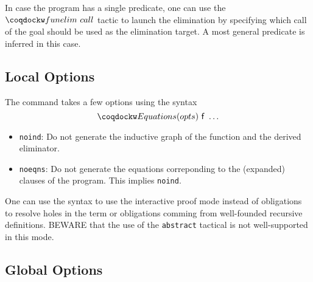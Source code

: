 In case the program has a single predicate, one can use the
$\tac{funelim}~call$ tactic to launch the elimination by specifying
which call of the goal should be used as the elimination target.
A most general predicate is inferred in this case.

\subsection{Local Options}
The  command takes a few options using the syntax
\[\kw{Equations}(opts)~\cst{f}~\ldots\]

\begin{itemize}
\item \texttt{noind}: Do not generate the inductive graph of the
  function and the derived eliminator.
\item \texttt{noeqns}: Do not generate the equations correponding to the
  (expanded) clauses of the program. This implies \texttt{noind}.
\end{itemize}

One can use the  syntax to use the interactive proof mode
instead of obligations to resolve holes in the term or obligations
comming from well-founded recursive definitions. BEWARE that the use
of the \texttt{abstract} tactical is not well-supported in this mode.

\subsection{Global Options}


